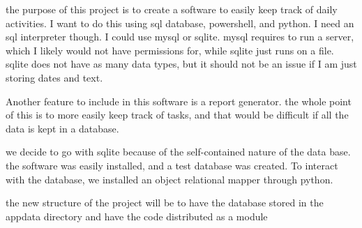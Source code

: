 the purpose of this project is to create a software to easily keep track of daily activities. I want to do this using sql database, powershell, and python. I need an sql interpreter though. I could use mysql or sqlite. mysql requires to run a server, which I likely would not have permissions for, while sqlite just runs on a file. sqlite does not have as many data types, but it should not be an issue if I am just storing dates and text.

Another feature to include in this software is a report generator. the whole point of this is to more easily keep track of tasks, and that would be difficult if all the data is kept in a database.

we decide to go with sqlite because of the self-contained nature of the data base. the software was easily installed, and a test database was created. To interact with the database, we installed an object relational mapper through python.

the new structure of the project will be to have the database stored in the appdata directory and have the code distributed as a module